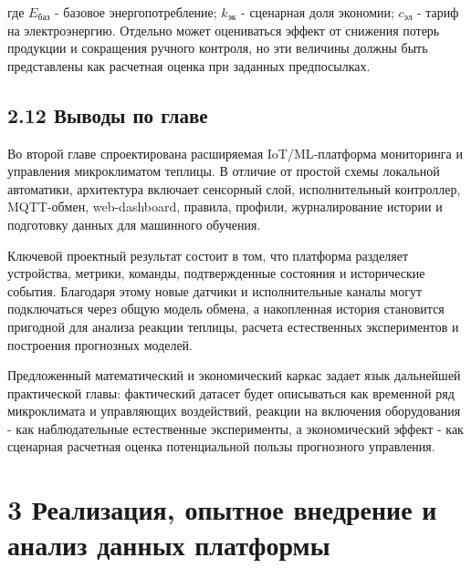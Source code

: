 \documentclass[a4paper,14pt]{extarticle}
\begin{document}
где \(E_{\text{баз}}\) - базовое энергопотребление; \(k_{\text{эк}}\) -
сценарная доля экономии; \(c_{\text{эл}}\) - тариф на электроэнергию.
Отдельно может оцениваться эффект от снижения потерь продукции и
сокращения ручного контроля, но эти величины должны быть представлены
как расчетная оценка при заданных предпосылках.

\hypertarget{ux432ux44bux432ux43eux434ux44b-ux43fux43e-ux433ux43bux430ux432ux435}{%
\subsection{2.12 Выводы по
главе}\label{ux432ux44bux432ux43eux434ux44b-ux43fux43e-ux433ux43bux430ux432ux435}}

Во второй главе спроектирована расширяемая IoT/ML-платформа мониторинга
и управления микроклиматом теплицы. В отличие от простой схемы локальной
автоматики, архитектура включает сенсорный слой, исполнительный
контроллер, MQTT-обмен, web-dashboard, правила, профили, журналирование
истории и подготовку данных для машинного обучения.

Ключевой проектный результат состоит в том, что платформа разделяет
устройства, метрики, команды, подтвержденные состояния и исторические
события. Благодаря этому новые датчики и исполнительные каналы могут
подключаться через общую модель обмена, а накопленная история становится
пригодной для анализа реакции теплицы, расчета естественных
экспериментов и построения прогнозных моделей.

Предложенный математический и экономический каркас задает язык
дальнейшей практической главы: фактический датасет будет описываться как
временной ряд микроклимата и управляющих воздействий, реакции на
включения оборудования - как наблюдательные естественные эксперименты, а
экономический эффект - как сценарная расчетная оценка потенциальной
пользы прогнозного управления.

\hypertarget{ux440ux435ux430ux43bux438ux437ux430ux446ux438ux44f-ux43eux43fux44bux442ux43dux43eux435-ux432ux43dux435ux434ux440ux435ux43dux438ux435-ux438-ux430ux43dux430ux43bux438ux437-ux434ux430ux43dux43dux44bux445-ux43fux43bux430ux442ux444ux43eux440ux43cux44b}{%
\section{3 Реализация, опытное внедрение и анализ данных
платформы}\label{ux440ux435ux430ux43bux438ux437ux430ux446ux438ux44f-ux43eux43fux44bux442ux43dux43eux435-ux432ux43dux435ux434ux440ux435ux43dux438ux435-ux438-ux430ux43dux430ux43bux438ux437-ux434ux430ux43dux43dux44bux445-ux43fux43bux430ux442ux444ux43eux440ux43cux44b}}
\end{document}
